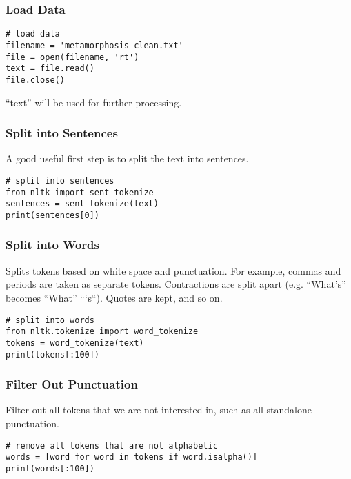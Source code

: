 \begin{frame}[fragile]
\frametitle{Load Data}
\begin{lstlisting}
# load data
filename = 'metamorphosis_clean.txt'
file = open(filename, 'rt')
text = file.read()
file.close()
\end{lstlisting}
``text'' will be used for further processing.
\end{frame}


\begin{frame}[fragile]
\frametitle{ Split into Sentences}
A good useful first step is to split the text into sentences.
\begin{lstlisting}
# split into sentences
from nltk import sent_tokenize
sentences = sent_tokenize(text)
print(sentences[0])
\end{lstlisting}
\end{frame}


\begin{frame}[fragile]
\frametitle{ Split into Words}
Splits tokens based on white space and punctuation. For example, commas and periods are taken as separate tokens. Contractions are split apart (e.g. “What’s” becomes “What” “‘s“). Quotes are kept, and so on.
\begin{lstlisting}
# split into words
from nltk.tokenize import word_tokenize
tokens = word_tokenize(text)
print(tokens[:100])
\end{lstlisting}
\end{frame}

\begin{frame}[fragile]
\frametitle{ Filter Out Punctuation}
Filter out all tokens that we are not interested in, such as all standalone punctuation.
\begin{lstlisting}
# remove all tokens that are not alphabetic
words = [word for word in tokens if word.isalpha()]
print(words[:100])
\end{lstlisting}
\end{frame}


